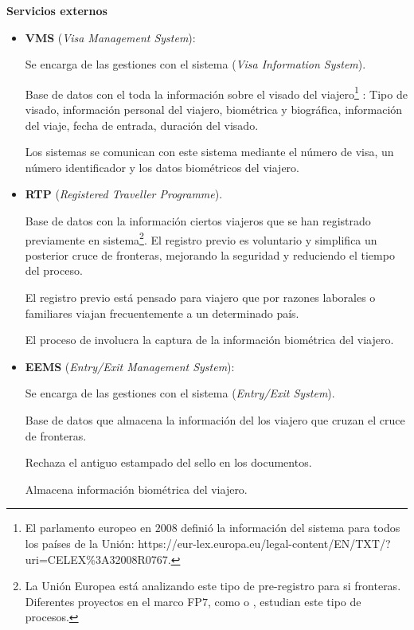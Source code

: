 \textbf{Servicios externos}

\begin{itemize}
    \item 
    \textbf{VMS} (\textit{Visa Management System}): 
    
    Se encarga de las gestiones con el sistema  (\textit{Visa Information System}).
    
    Base de datos con el toda la información sobre el visado del viajero\footnote{El parlamento europeo en $2008$ definió la información del sistema  para todos los países de la Unión:  https://eur-lex.europa.eu/legal-content/EN/TXT/?uri=CELEX\%3A32008R0767.} : Tipo de visado, información personal del viajero, biométrica y biográfica, información del viaje, fecha de entrada, duración del visado.
    
    Los sistemas  se comunican con este sistema mediante el número de visa, un número identificador y los datos biométricos del viajero.

    \item 
    \textbf{RTP} (\textit{Registered Traveller Programme}).
    
    Base de datos con la información ciertos viajeros que se han registrado previamente en sistema\footnote{La Unión Europea está analizando este tipo de pre-registro para si fronteras. Diferentes proyectos en el marco FP$7$, como  o , estudian este tipo de procesos.}. El registro previo es voluntario y simplifica un posterior cruce de fronteras, mejorando la seguridad y reduciendo el tiempo del proceso. 
    
    El registro previo está pensado para viajero que por razones laborales o familiares viajan frecuentemente a un determinado país.
    
    El proceso de  involucra la captura de la información biométrica del viajero.   
    
    
    \item 
    \textbf{EEMS} (\textit{Entry/Exit Management System}):
    
    Se encarga de las gestiones con el sistema  (\textit{Entry/Exit System}).
    
    Base de datos que almacena la información del los viajero que cruzan el cruce de fronteras.
    
    Rechaza el antiguo estampado del sello en los documentos.
    
    Almacena información biométrica del viajero.
    

\end{itemize}

